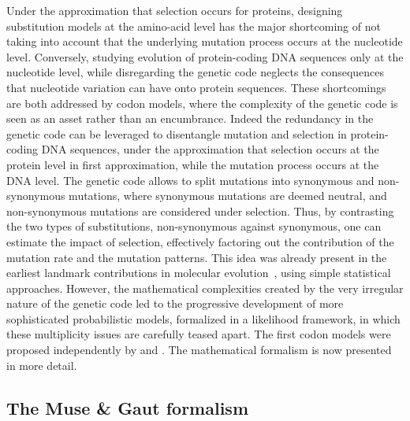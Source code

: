 Under the approximation that selection occurs for proteins, designing \gls{substitution} models at the amino-acid level has the major shortcoming of not taking into account that the underlying mutation process occurs at the nucleotide level.
Conversely, studying evolution of protein-coding \acrshort{DNA} sequences only at the nucleotide level, while disregarding the genetic code neglects the consequences that nucleotide variation can have onto protein sequences.
These shortcomings are both addressed by \gls{codon} models, where the complexity of the genetic code is seen as an asset rather than an encumbrance.
Indeed the redundancy in the genetic code can be leveraged to disentangle mutation and selection in protein-coding \acrshort{DNA} sequences, under the approximation that selection occurs at the protein level in first approximation, while the mutation process occurs at the \acrshort{DNA} level.
The genetic code allows to split mutations into \gls{synonymous} and \gls{non-synonymous} mutations, where \gls{synonymous} mutations are deemed \gls{neutral}, and \gls{non-synonymous} mutations are considered under selection.
Thus, by contrasting the two types of \glspl{substitution}, \gls{non-synonymous} against \gls{synonymous}, one can estimate the impact of selection, effectively factoring out the contribution of the mutation rate and the mutation patterns.
This idea was already present in the earliest landmark contributions in molecular evolution~\citep{Kimura1968,King1969}, using simple statistical approaches.
However, the mathematical complexities created by the very irregular nature of the genetic code led to the progressive development of more sophisticated probabilistic models, formalized in a \gls{likelihood} framework, in which these multiplicity issues are carefully teased apart.
The first \gls{codon} models were proposed independently by \citet{Muse1994} and \citet{Goldman1994}.
The mathematical formalism is now presented in more detail.

\subsection{The Muse \& Gaut formalism}
\label{subsec:MG-formalism}

